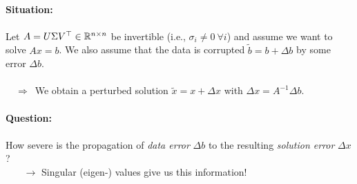\begin{frame}
~\\
\textbf{\color{header}Situation:}\\~\\
 Let $A = U\Sigma V^\top  \in {\mathbb{R}}^{n\times n}$ be invertible (i.e., $\sigma_i \neq 0~ \forall i$) and assume we want to solve $Ax=b$. We also assume that the data is corrupted $\tilde{b} = b+\Delta b$ by some error $\Delta b$.\\~\\
~~$\Rightarrow$~We obtain a perturbed solution $\tilde{x} = x + \Delta x$ with $\Delta x=A^{-1}\Delta b$.\\~\\
\textbf{\color{header}Question:}\\~\\ How severe is the propagation of \textit{data error} $\Delta b$ to the resulting \textit{solution error} $\Delta x$?\\
~~~ $\rightarrow$ Singular (eigen-) values give us this information!~\\
\end{frame}

